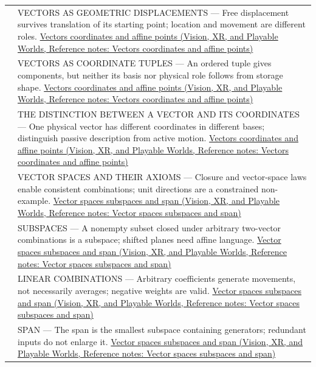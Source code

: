 {\begin{longtable}[]{@{}
  >{\raggedright\arraybackslash}p{}
  >{\raggedright\arraybackslash}p{}@{}}
504 & VECTORS AS GEOMETRIC DISPLACEMENTS --- Free displacement survives translation of its starting point; location and movement are different roles. \href{../07-Vision-XR-and-Playable-Worlds/main.pdf\#nameddest=appendix-0659864c0aa3}{Vectors coordinates and affine points (Vision, XR, and Playable Worlds, Reference notes: Vectors coordinates and affine points)} \\
505 & VECTORS AS COORDINATE TUPLES --- An ordered tuple gives components, but neither its basis nor physical role follows from storage shape. \href{../07-Vision-XR-and-Playable-Worlds/main.pdf\#nameddest=appendix-0659864c0aa3}{Vectors coordinates and affine points (Vision, XR, and Playable Worlds, Reference notes: Vectors coordinates and affine points)} \\
506 & THE DISTINCTION BETWEEN A VECTOR AND ITS COORDINATES --- One physical vector has different coordinates in different bases; distinguish passive description from active motion. \href{../07-Vision-XR-and-Playable-Worlds/main.pdf\#nameddest=appendix-0659864c0aa3}{Vectors coordinates and affine points (Vision, XR, and Playable Worlds, Reference notes: Vectors coordinates and affine points)} \\
507 & VECTOR SPACES AND THEIR AXIOMS --- Closure and vector-space laws enable consistent combinations; unit directions are a constrained non-example. \href{../07-Vision-XR-and-Playable-Worlds/main.pdf\#nameddest=appendix-173b52c063ae}{Vector spaces subspaces and span (Vision, XR, and Playable Worlds, Reference notes: Vector spaces subspaces and span)} \\
508 & SUBSPACES --- A nonempty subset closed under arbitrary two-vector combinations is a subspace; shifted planes need affine language. \href{../07-Vision-XR-and-Playable-Worlds/main.pdf\#nameddest=appendix-173b52c063ae}{Vector spaces subspaces and span (Vision, XR, and Playable Worlds, Reference notes: Vector spaces subspaces and span)} \\
509 & LINEAR COMBINATIONS --- Arbitrary coefficients generate movements, not necessarily averages; negative weights are valid. \href{../07-Vision-XR-and-Playable-Worlds/main.pdf\#nameddest=appendix-173b52c063ae}{Vector spaces subspaces and span (Vision, XR, and Playable Worlds, Reference notes: Vector spaces subspaces and span)} \\
510 & SPAN --- The span is the smallest subspace containing generators; redundant inputs do not enlarge it. \href{../07-Vision-XR-and-Playable-Worlds/main.pdf\#nameddest=appendix-173b52c063ae}{Vector spaces subspaces and span (Vision, XR, and Playable Worlds, Reference notes: Vector spaces subspaces and span)} \\

\end{longtable}}
